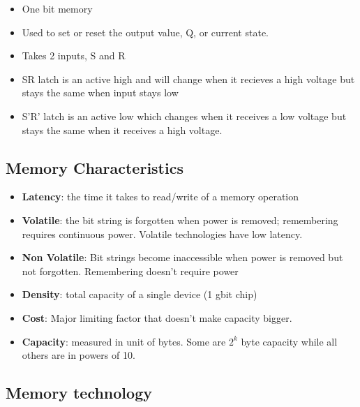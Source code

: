 \documentclass{article}
\begin{document}
\begin{itemize}
    \item One bit memory
    
    \item Used to set or reset the output value, Q, or current state. 
    
    \item Takes 2 inputs, S and R
    
    \item SR latch is an active high and will change when it recieves a high voltage but stays the same when input stays low
    
    \item S'R' latch is an active low which changes when it receives a low voltage but stays the same when it receives a high voltage.
\end{itemize}

\subsection{Memory Characteristics}
\begin{itemize}
    \item \textbf{Latency}: the time it takes to read/write of a memory
    operation 
    
    \item \textbf{Volatile}: the bit string is forgotten when power is removed; remembering requires continuous power. Volatile technologies have low latency. 
    
    \item \textbf{Non Volatile}: Bit strings become inaccessible when power is removed but not forgotten. Remembering doesn't require power
    
    \item \textbf{Density}: total capacity of a single device (1 gbit chip)
    
    \item \textbf{Cost}: Major limiting factor that doesn't make capacity bigger.
    
    \item \textbf{Capacity}: measured in unit of bytes. Some are $2^k$ byte capacity while all others are in powers of 10.
    
\end{itemize}

\subsection{Memory technology}
\end{document}
